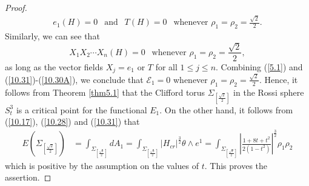 \documentclass[10pt,a4paper]{amsart}
\begin{document}
\begin{proof}
\begin{equation}
\begin{split}
e_1(H)=0~~\mbox{ and }~~
T(H)=0~~\mbox{ whenever }\rho_1=\rho_2=\frac{\sqrt{2}}{2}. 
\end{split}
\end{equation}
Similarly, we can see that 
\begin{equation}\label{10.30A}
X_1X_2\cdots X_n(H)=0~~\mbox{ whenever }\rho_1=\rho_2=\frac{\sqrt{2}}{2},
\end{equation}
as long as the vector fields $X_j=e_1$ or $T$ for all $1\leq j\leq n$. 
Combining 
(\ref{5.1}) and (\ref{10.31})-(\ref{10.30A}), we conclude that 
$\mathcal{E}_1=0$ 
whenever $\rho_1=\rho_2=\frac{\sqrt{2}}{2}$. 
Hence, it follows from Theorem \ref{thm5.1} that the Clifford torus
 $\Sigma_{[\frac{\sqrt{2}}{2}]}$ 
in the Rossi sphere $S^3_{t}$
is a critical point for the functional $E_1$. 
On the other hand, 
it follows from (\ref{10.17}), (\ref{10.28}) and (\ref{10.31})
that 
\begin{equation*}
\begin{split}
E(\Sigma_{[\frac{\sqrt{2}}{2}]})
&=\int_{\Sigma_{[\frac{\sqrt{2}}{2}]}}dA_1=\int_{\Sigma_{[\frac{\sqrt{2}}{2}]}}|H_{cr}|^{\frac{3}{2}}\theta\wedge e^1=\int_{\Sigma_{[\frac{\sqrt{2}}{2}]}}\left|\frac{1+8t+t^2}{2(1-t^2)}\right|^{\frac{3}{2}}\rho_1\rho_2
\end{split}
\end{equation*}
which is positive by the assumption on the values of $t$. 
This proves the assertion. 
\end{proof}
\end{document}
